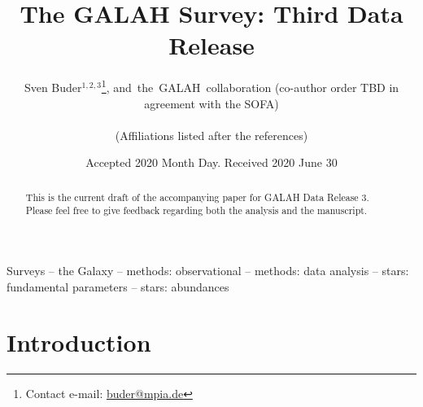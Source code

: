 \documentclass[fleqn,usenatbib,useAMS]{mnras}
\begin{document}
\begin{CJK*}{UTF8}{gbsn}
\label{firstpage}
\pagerange{\pageref{firstpage}--\pageref{lastpage}}


\title{The GALAH Survey: Third Data Release}

\author[Buder et al.]{Sven Buder$^{1,2,3}$\thanks{Contact e-mail: \href{mailto:buder@mpia.de}{buder@mpia.de}},
and~the~GALAH~collaboration \newauthor
(co-author order TBD in agreement with the SOFA)
\\
\\
(Affiliations listed after the references)}

\date{Accepted 2020 Month Day. Received 2020 June 30}


\maketitle
\end{CJK*}

\begin{abstract}
This is the current draft of the accompanying paper for GALAH Data Release 3. \\
Please feel free to give feedback regarding both the analysis and the manuscript.
%
\end{abstract}

\begin{keywords}
Surveys -- 
the Galaxy --
methods: observational --
methods: data analysis --
stars: fundamental parameters -- 
stars: abundances
\end{keywords}



\section{Introduction} \label{sec:introduction}
\end{document}
